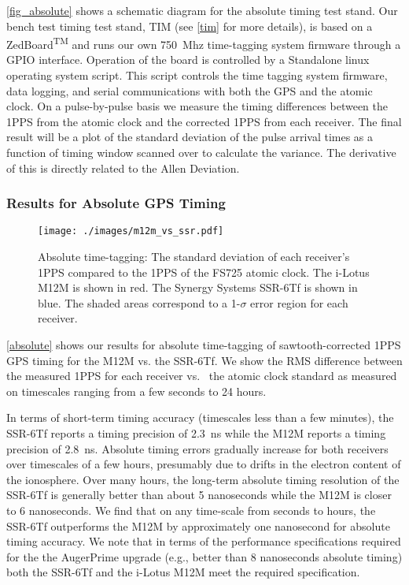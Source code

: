 \autoref{fig_absolute} shows a schematic diagram for the absolute timing test stand.  Our bench test timing test stand, TIM (see \autoref{tim} for more details), is based on a ZedBoard\textsuperscript{TM} and runs our own 750~Mhz time-tagging system firmware
through a GPIO interface.  Operation of the board is controlled by a
Standalone linux operating system script. This script
controls the time tagging system firmware, data logging, and serial
communications with both the GPS and the atomic clock.  On a
pulse-by-pulse basis we measure the timing differences between the
1PPS from the atomic clock and the corrected 1PPS from each receiver. The
final result will be a plot of the standard deviation of the pulse arrival
times as a function of timing window scanned over to calculate the
variance. The derivative of this is directly related to the Allen
Deviation. 




\subsubsection{Results for Absolute GPS Timing} 
\begin{figure}[H]
\centering
\texttt{[image: ./images/m12m\_vs\_ssr.pdf]}
\caption[Absolute Timing Test Results]{Absolute time-tagging: The standard deviation of each
  receiver's 1PPS compared to the 1PPS of the FS725 atomic clock.  The
  i-Lotus M12M is shown in red.  The Synergy Systems SSR-6Tf is shown in
  blue.  The shaded areas correspond to a 1-$\sigma$ error region for
  each receiver.}
\label{absolute}
\end{figure}
\autoref{absolute} shows our results for absolute time-tagging of sawtooth-corrected 1PPS GPS timing for the M12M
vs. the SSR-6Tf. We show the RMS difference between the measured 1PPS
for each receiver vs.~ the atomic clock standard as measured on
timescales ranging from a few seconds to 24 hours.

In terms of short-term timing accuracy (timescales less than a few
minutes), the SSR-6Tf reports a timing precision of 2.3~ns while the M12M
reports a timing precision of 2.8~ns.  Absolute timing errors gradually
increase for both receivers over timescales of a few hours,
presumably due to drifts in the electron content of the ionosphere. Over many hours, the long-term absolute
timing resolution of the SSR-6Tf is generally better than about 5
nanoseconds while the M12M is closer to 6 nanoseconds. We
  find that on any time-scale from seconds to hours, the SSR-6Tf
  outperforms the M12M by approximately one nanosecond for absolute
  timing accuracy.  We note that in terms of the performance
specifications required for the the AugerPrime upgrade (e.g., better
than 8 nanoseconds absolute timing) both the SSR-6Tf and the i-Lotus M12M meet the
required specification.

